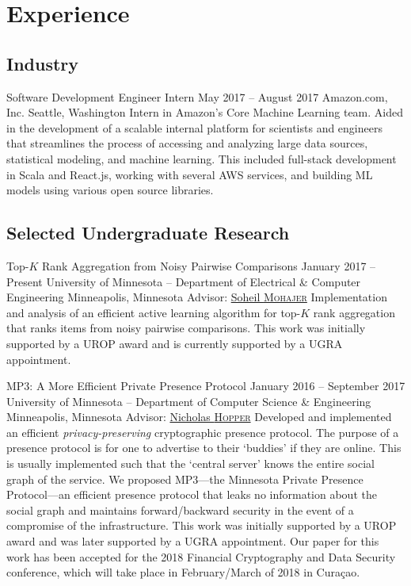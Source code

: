 \section{Experience}
\subsection{Industry}
\block
  {Software Development Engineer Intern}
  {May 2017 -- August 2017}
  {Amazon.com, Inc.}
  {Seattle, Washington}
  {}
  {
    Intern in Amazon's Core Machine Learning team. Aided in the development
    of a scalable internal platform for scientists and engineers that
    streamlines the process of accessing and analyzing large data sources,
    statistical modeling, and machine learning. This included full-stack
    development in Scala and React.js, working with several AWS services, and
    building ML models using various open source libraries.
  }

\subsection{Selected Undergraduate Research}
\block
  {Top-\boldmath$K$ Rank Aggregation from Noisy Pairwise Comparisons}
  {January 2017 -- Present}
  {University of Minnesota -- Department of Electrical \& Computer Engineering}
  {Minneapolis, Minnesota}
  {Advisor: \href{\soheil}{Soheil \textsc{Mohajer}}}
  {
    Implementation and analysis of an efficient active learning algorithm for
    top-$K$ rank aggregation that ranks items from noisy pairwise comparisons.
    This work was initially supported by a UROP award and is currently supported
    by a UGRA appointment.
  }

\block
  {MP3: A More Efficient Private Presence Protocol}
  {January 2016 -- September 2017}
  {University of Minnesota -- Department of Computer Science \& Engineering}
  {Minneapolis, Minnesota}
  {Advisor: \href{\hoppernj}{Nicholas \textsc{Hopper}}}
  {
    Developed and implemented an efficient \emph{privacy-preserving}
    cryptographic presence protocol. The purpose of a presence protocol is for
    one to advertise to their `buddies' if they are online. This is usually
    implemented such that the `central server' knows the entire social graph of
    the service. We proposed MP3---the Minnesota Private Presence Protocol---an
    efficient presence protocol that leaks no information about the social graph
    and maintains forward/backward security in the event of a compromise of the
    infrastructure.  This work was initially supported by a UROP award and was
    later supported by a UGRA appointment. Our paper for this work has been
    accepted for the 2018 Financial Cryptography and Data Security conference,
    which will take place in February/March of 2018 in Cura\c{c}ao.
  }

